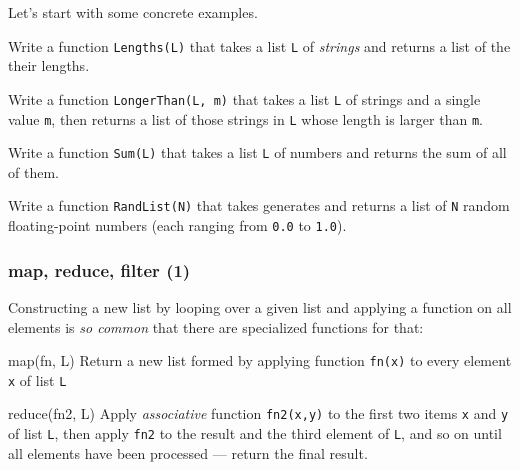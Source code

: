 \documentclass[english,serif,mathserif]{beamer}
\begin{document}
\begin{frame}[fragile]
  \small
  Let's start with some concrete examples.

  \+
  \begin{exercise*}[1.A]
    Write a function \texttt{Lengths(L)} that takes a list \texttt{L} of
    \emph{strings} and returns a list of the their lengths.
  \end{exercise*}

  \+
  \begin{exercise*}[1.B]
    Write a function \texttt{LongerThan(L, m)} that takes a list
    \texttt{L} of strings and a single value \texttt{m}, then returns
    a list of those strings in \texttt{L} whose length is larger than
    \texttt{m}.
  \end{exercise*}

  \+
  \begin{exercise*}[1.C]
    Write a function \texttt{Sum(L)} that takes a list \texttt{L} of numbers and
    returns the sum of all of them.
  \end{exercise*}

  \+
  \begin{exercise*}[1.D]
    Write a function \texttt{RandList(N)} that takes generates and
    returns a list of \texttt{N} random floating-point numbers (each
    ranging from \texttt{0.0} to \texttt{1.0}).
  \end{exercise*}

\end{frame}


\begin{frame}
  \frametitle{map, reduce, filter (1)}

  Constructing a new list by looping over a given list and applying a function
  on all elements is \emph{so common} that there are specialized functions for that:

  \+
  \begin{describe}{map(fn, L)}
    Return a new list formed by applying function \texttt{fn(x)} to every
    element \texttt{x} of list \texttt{L}
  \end{describe}

  \+
  \begin{describe}{reduce(fn2, L)}
    Apply \emph{associative} function \texttt{fn2(x,y)} to the first two items \texttt{x} and
    \texttt{y} of list \texttt{L}, then apply \texttt{fn2} to the result and the
    third element of \texttt{L}, and so on until all elements have been
    processed --- return the final result.
  \end{describe}
\end{frame}
\end{document}
